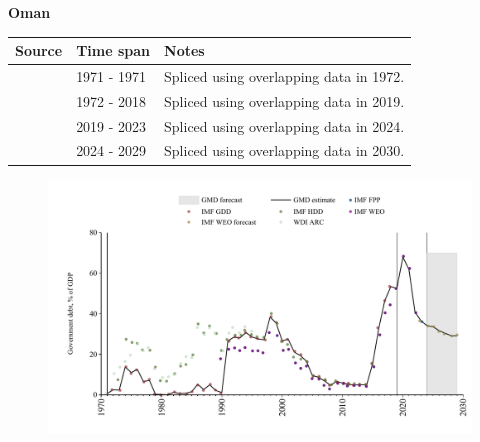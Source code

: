 \documentclass[12pt,a4paper,landscape]{article}
\begin{document}
\begin{adjustbox}{max totalsize={\paperwidth}{\paperheight},center}
\begin{minipage}[t][\textheight][t]{\textwidth}
\vspace*{0.5cm}
{}
\begin{center}
{\Large\bfseries Oman}
\end{center}
\vspace{0.5cm}
\begin{table}[H]
\centering
\small
\begin{tabular}{|l|l|l|}
\hline
\textbf{Source} & \textbf{Time span} & \textbf{Notes} \\
\hline
\rowcolor{white}\cite{WDI_ARC}& 1971 - 1971 &Spliced using overlapping data in 1972.\\
\rowcolor{lightgray}\cite{IMF_GDD}& 1972 - 2018 &Spliced using overlapping data in 2019.\\
\rowcolor{white}\cite{IMF_FPP}& 2019 - 2023 &Spliced using overlapping data in 2024.\\
\rowcolor{lightgray}\cite{IMF_WEO_forecast}& 2024 - 2029 &Spliced using overlapping data in 2030.\\
\hline
\end{tabular}
\end{table}
\begin{figure}[H]
\centering
\includegraphics[width=\textwidth,height=0.6\textheight,keepaspectratio]{graphs/OMN_govdebt_GDP.pdf}
\end{figure}
\end{minipage}
\end{adjustbox}
\end{document}
